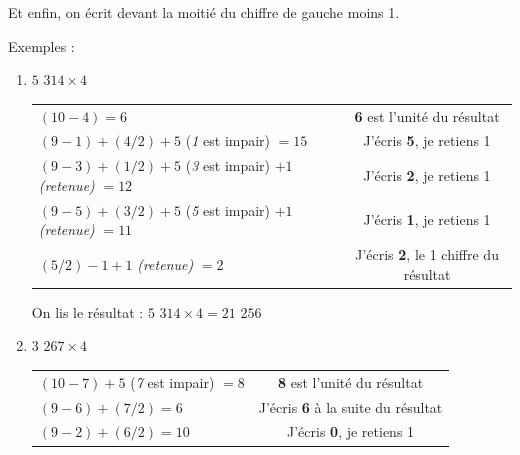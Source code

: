 \documentclass[a4paper, twoside]{article}
\begin{document}
		Et enfin, on écrit devant la moitié du chiffre de gauche moins 1.\\

		\vspace{-2 mm}

		{ \parindent=0.5cm Exemples : }

		\begin{small}
		\begin{enumerate}

			\item $5$ $314 \times 4$
			
			\begin{tabular}{l|c}
			
				$(10 - 4) = 6$ & \textbf{6} est l'unité du résultat
				
				\tabularnewline
				
				$(9 - 1) + (4 / 2) + 5$ (\textit{1} est impair) $= 15$ & J'écris \textbf{5}, je retiens 1
				
				\tabularnewline
				
				$(9 - 3) + (1 / 2) + 5$ (\textit{3} est impair) $+ 1$ \textit{(retenue)} $= 12$ & J'écris \textbf{2}, je retiens 1
				
				\tabularnewline
				
				$(9 - 5) + (3 / 2) + 5$ (\textit{5} est impair) $+ 1$ \textit{(retenue)} $= 11$ & J'écris \textbf{1}, je retiens 1 
				
				\tabularnewline
				
				$(5 / 2) - 1 + 1$ \textit{(retenue)} $= 2$ & J'écris \textbf{2}, le 1\up{er} chiffre du résultat
				
				
			\end{tabular}
			
			On lis le résultat : {\boldmath$5$ $314 \times 4 = 21$ $256$}\\


		\smallskip

			\item $3$ $267 \times 4$
			
			\begin{tabular}{l|c}
			
				$(10 - 7) + 5$ (\textit{7} est impair) $= 8$ & \textbf{8} est l'unité du résultat
				
				\tabularnewline
				
				$(9 - 6) + (7 / 2) = 6$ & J'écris \textbf{6} à la suite du résultat
				
				\tabularnewline
				
				$(9 - 2) + (6 / 2) = 10$ & J'écris \textbf{0}, je retiens 1
				

\end{tabular}
\end{enumerate}
\end{small}
\end{document}
